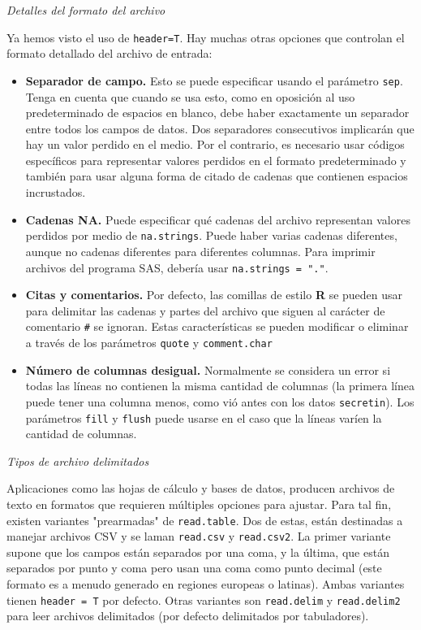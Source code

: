 \textit{Detalles del formato del archivo}

Ya hemos visto el uso de \texttt{header=T}. Hay muchas otras opciones que
controlan el formato detallado del archivo de entrada:

\begin{itemize}

\item
\textbf{Separador de campo.} Esto se puede especificar usando el parámetro
\texttt{sep}. Tenga en cuenta que cuando se usa esto, como en oposición al uso
predeterminado de espacios en blanco, debe haber exactamente un separador entre
todos los campos de datos. Dos separadores consecutivos implicarán que hay un
valor perdido en el medio. Por el contrario, es necesario usar códigos
específicos para representar valores perdidos en el formato predeterminado y
también para usar alguna forma de citado de cadenas que contienen espacios
incrustados.

\item
\textbf{Cadenas NA.} Puede especificar qué cadenas del archivo representan
valores perdidos por medio de \texttt{na.strings}. Puede haber varias cadenas
diferentes, aunque no cadenas diferentes para diferentes columnas. Para imprimir
archivos del programa SAS, debería usar  \texttt{na.strings = "."}.

\item
\textbf{Citas y comentarios.} Por defecto, las comillas de estilo \textbf{R} se
pueden usar para delimitar las cadenas y partes del archivo que siguen al
carácter de comentario \texttt{\#} se ignoran. Estas características se pueden
modificar o eliminar a través de los parámetros \texttt{quote} y
\texttt{comment.char}

\item
\textbf{Número de columnas desigual.} Normalmente se considera un error si todas
las líneas no contienen la misma cantidad de columnas (la primera línea puede
tener una columna menos, como vió antes con los datos \texttt{secretin}). Los
parámetros \texttt{fill} y \texttt{flush} puede usarse en el caso que la líneas
varíen la cantidad de columnas.

\end{itemize}

\textit{Tipos de archivo delimitados}

Aplicaciones como las hojas de cálculo y bases de datos, producen archivos de
texto en formatos que requieren múltiples opciones para ajustar. Para tal fin,
existen variantes "prearmadas" de \texttt{read.table}. Dos de estas, están
destinadas a manejar archivos CSV y se laman \texttt{read.csv} y
\texttt{read.csv2}. La primer variante supone que los campos están separados por
una coma, y la última, que están separados por punto y coma pero usan una coma
como punto decimal (este formato es a menudo generado en regiones europeas o
latinas). Ambas variantes tienen \texttt{header = T} por defecto. Otras
variantes son \texttt{read.delim} y \texttt{read.delim2} para leer archivos
delimitados (por defecto delimitados por tabuladores).

